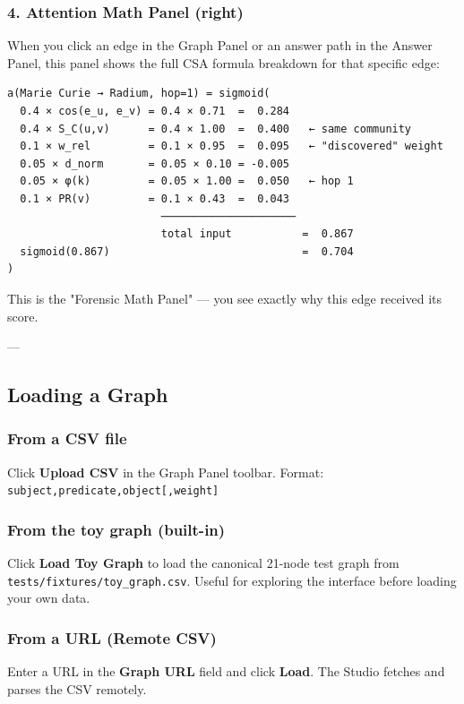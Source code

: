 \documentclass[11pt,article,oneside]{memoir}
\begin{document}
\subsubsection{4. Attention Math Panel (right)}
When you click an edge in the Graph Panel or an answer path in the Answer Panel, this panel shows the full CSA formula breakdown for that specific edge:

\begin{lstlisting}
a(Marie Curie → Radium, hop=1) = sigmoid(
  0.4 × cos(e_u, e_v) = 0.4 × 0.71  =  0.284
  0.4 × S_C(u,v)      = 0.4 × 1.00  =  0.400   ← same community
  0.1 × w_rel         = 0.1 × 0.95  =  0.095   ← "discovered" weight
  0.05 × d_norm       = 0.05 × 0.10 = -0.005
  0.05 × φ(k)         = 0.05 × 1.00 =  0.050   ← hop 1
  0.1 × PR(v)         = 0.1 × 0.43  =  0.043
                        ─────────────────────
                        total input           =  0.867
  sigmoid(0.867)                              =  0.704
)
\end{lstlisting}

This is the "Forensic Math Panel" — you see exactly why this edge received its score.

---

\subsection{Loading a Graph}

\subsubsection{From a CSV file}
Click \textbf{Upload CSV} in the Graph Panel toolbar. Format: \texttt{subject,predicate,object[,weight]}

\subsubsection{From the toy graph (built-in)}
Click \textbf{Load Toy Graph} to load the canonical 21-node test graph from \texttt{tests/fixtures/toy\_graph.csv}. Useful for exploring the interface before loading your own data.

\subsubsection{From a URL (Remote CSV)}
Enter a URL in the \textbf{Graph URL} field and click \textbf{Load}. The Studio fetches and parses the CSV remotely.
\end{document}

